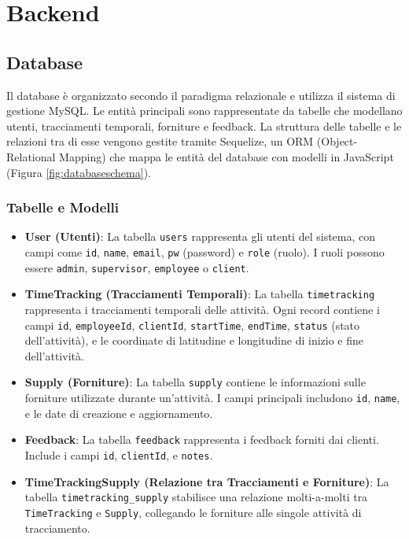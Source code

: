 \documentclass[twoside]{supsistudent}
\begin{document}
\section{Backend}
\subsection{Database}
Il database è organizzato secondo il paradigma relazionale e utilizza il sistema di gestione MySQL. Le entità principali sono rappresentate da tabelle che modellano utenti, tracciamenti temporali, forniture e feedback. La struttura delle tabelle e le relazioni tra di esse vengono gestite tramite Sequelize, un ORM (Object-Relational Mapping) che mappa le entità del database con modelli in JavaScript (Figura \ref{fig:databaseschema}).

\subsubsection{Tabelle e Modelli}
\begin{itemize}
  \item \textbf{User (Utenti)}: La tabella \texttt{users} rappresenta gli utenti del sistema, con campi come \texttt{id}, \texttt{name}, \texttt{email}, \texttt{pw} (password) e \texttt{role} (ruolo). I ruoli possono essere \texttt{admin}, \texttt{supervisor}, \texttt{employee} o \texttt{client}.
  \item \textbf{TimeTracking (Tracciamenti Temporali)}: La tabella \texttt{timetracking} rappresenta i tracciamenti temporali delle attività. Ogni record contiene i campi \texttt{id}, \texttt{employeeId}, \texttt{clientId}, \texttt{startTime}, \texttt{endTime}, \texttt{status} (stato dell'attività), e le coordinate di latitudine e longitudine di inizio e fine dell'attività.
  \item \textbf{Supply (Forniture)}: La tabella \texttt{supply} contiene le informazioni sulle forniture utilizzate durante un'attività. I campi principali includono \texttt{id}, \texttt{name}, e le date di creazione e aggiornamento.
  \item \textbf{Feedback}: La tabella \texttt{feedback} rappresenta i feedback forniti dai clienti. Include i campi \texttt{id}, \texttt{clientId}, e \texttt{notes}.
  \item \textbf{TimeTrackingSupply (Relazione tra Tracciamenti e Forniture)}: La tabella \texttt{timetracking\_supply} stabilisce una relazione molti-a-molti tra \texttt{TimeTracking} e \texttt{Supply}, collegando le forniture alle singole attività di tracciamento.
\end{itemize}
\end{document}
